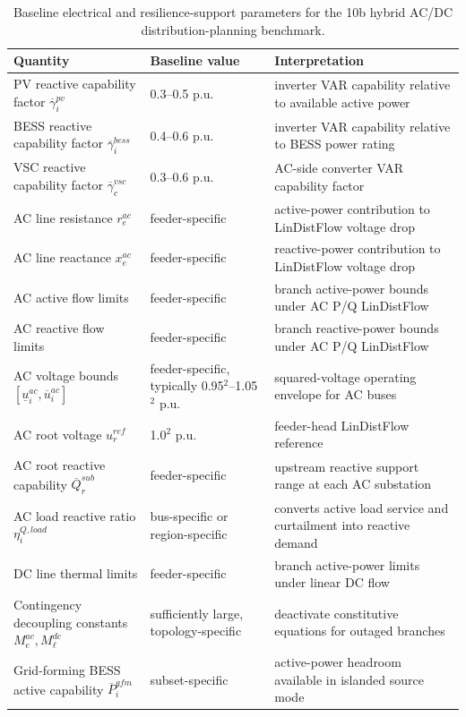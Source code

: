 \begin{table}[t]
\centering
\caption{Baseline electrical and resilience-support parameters for the 10b hybrid AC/DC distribution-planning benchmark.}
\label{tab:10b-parameter-baseline-b}
\begin{tabular}{L{0.34\textwidth}L{0.22\textwidth}L{0.34\textwidth}}
\toprule
Quantity & Baseline value & Interpretation \\
\midrule
PV reactive capability factor \(\overline\gamma_i^{pv}\) & 0.3--0.5 p.u. & inverter VAR capability relative to available active power \\
BESS reactive capability factor \(\overline\gamma_i^{bess}\) & 0.4--0.6 p.u. & inverter VAR capability relative to BESS power rating \\
VSC reactive capability factor \(\overline\gamma_c^{vsc}\) & 0.3--0.6 p.u. & AC-side converter VAR capability factor \\
AC line resistance \(r_e^{ac}\) & feeder-specific & active-power contribution to LinDistFlow voltage drop \\
AC line reactance \(x_e^{ac}\) & feeder-specific & reactive-power contribution to LinDistFlow voltage drop \\
AC active flow limits & feeder-specific & branch active-power bounds under AC P/Q LinDistFlow \\
AC reactive flow limits & feeder-specific & branch reactive-power bounds under AC P/Q LinDistFlow \\
AC voltage bounds \([\underline u_i^{ac},\overline u_i^{ac}]\) & feeder-specific, typically 0.95\(^2\)--1.05\(^2\) p.u. & squared-voltage operating envelope for AC buses \\
AC root voltage \(u_r^{ref}\) & 1.0\(^2\) p.u. & feeder-head LinDistFlow reference \\
AC root reactive capability \(\overline Q_r^{sub}\) & feeder-specific & upstream reactive support range at each AC substation \\
AC load reactive ratio \(\eta_i^{Q,load}\) & bus-specific or region-specific & converts active load service and curtailment into reactive demand \\
DC line thermal limits & feeder-specific & branch active-power limits under linear DC flow \\
Contingency decoupling constants \(M_e^{ac},M_\ell^{dc}\) & sufficiently large, topology-specific & deactivate constitutive equations for outaged branches \\
Grid-forming BESS active capability \(\overline P_i^{gfm}\) & subset-specific & active-power headroom available in islanded source mode \\

\end{tabular}
\end{table}
